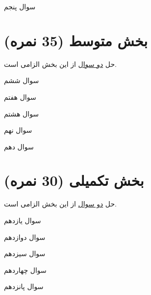\documentclass{article}
\begin{document}
    
    \begin{problem}{سوال پنجم}
    
    \end{problem}
\raggedleft    
\section{بخش متوسط (35 نمره)}
\centering
حل \underline{دو سوال} از این بخش الزامی است.
\begin{problem}{سوال ششم}


\end{problem}
	

\begin{problem}{سوال هفتم}
	
\end{problem}


\begin{problem}{سوال هشتم}
	

\end{problem}


\begin{problem}{سوال نهم}
	
\end{problem}


\begin{problem}{سوال دهم}
	
	
\end{problem}


\raggedleft
\section{ بخش تکمیلی (30 نمره)}
\centering
حل \underline{دو سوال} از این بخش الزامی است.
\begin{problem}{سوال یازدهم}
	
\end{problem}



\begin{problem}{سوال دوازدهم}
	
\end{problem}



\begin{problem}{سوال سیزدهم}
	
	
	
\end{problem}


\begin{problem}{سوال چهاردهم}

	
\end{problem}


\begin{problem}{سوال پانزدهم}
	
\end{problem}
\end{document}
